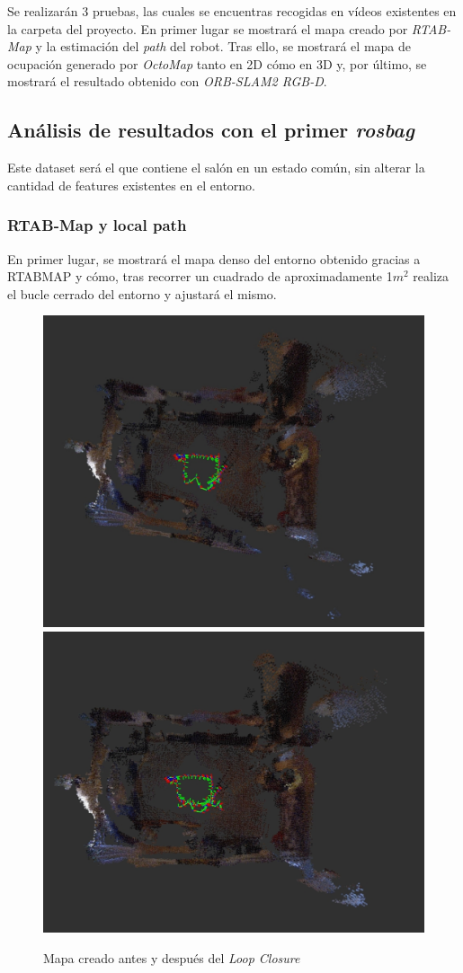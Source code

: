 Se realizarán 3 pruebas, las cuales se encuentras recogidas en vídeos existentes en la carpeta del proyecto. En primer lugar se mostrará el mapa creado por \textit{RTAB-Map} y
la estimación del \textit{path} del robot. Tras ello, se mostrará el mapa de ocupación generado por \textit{OctoMap} tanto en 2D cómo en 3D y, por último, se mostrará el
resultado obtenido con \textit{ORB-SLAM2 RGB-D}.
\newpage
\subsection{Análisis de resultados con el primer \textit{rosbag}}
Este dataset será el que contiene el salón en un estado común, sin alterar la cantidad de features existentes en el entorno.
\subsubsection{RTAB-Map y local path}
En primer lugar, se mostrará el mapa denso del entorno obtenido gracias a RTABMAP y cómo, tras recorrer un cuadrado de aproximadamente 1$m^2$ realiza el bucle cerrado del entorno
y ajustará el mismo.
\begin{figure}[h!]
    \centering
    \includegraphics[width=.4\textwidth]{images/slam/bag1_rtabmap_noLC}
    \includegraphics[width=.415\textwidth]{images/slam/bag1_rtabmap_LC}
    \caption{Mapa creado antes y después del \textit{Loop Closure}}
\end{figure}

